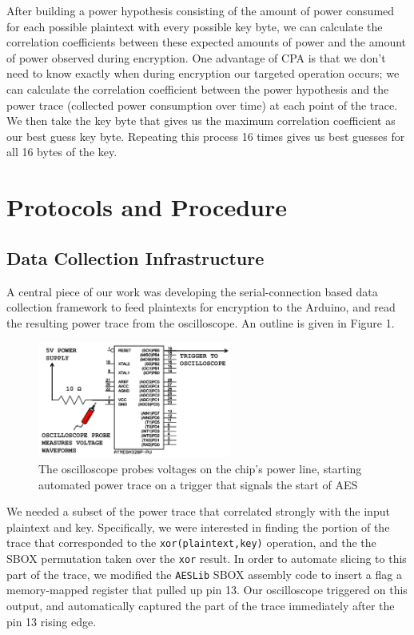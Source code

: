 \documentclass[journal]{ieee_style}
\begin{document}
After building a power hypothesis consisting of the amount of power consumed for each possible plaintext with every possible key byte, we can calculate the correlation coefficients between these expected amounts of power and the amount of power observed during encryption. One advantage of CPA is that we don't need to know exactly when during encryption our targeted operation occurs; we can calculate the correlation coefficient between the power hypothesis and the power trace (collected power consumption over time) at each point of the trace. We then take the key byte that gives us the maximum correlation coefficient as our best guess key byte. Repeating this process 16 times gives us best guesses for all 16 bytes of the key.


\section{Protocols and Procedure}
\subsection{Data Collection Infrastructure}
A central piece of our work was developing the serial-connection based data collection framework to feed plaintexts for encryption to the Arduino, and read the resulting power trace from the oscilloscope. An outline is given in Figure 1.

\begin{figure}[!t]
\centering
\includegraphics[width=2.5in]{setup}
\caption{The oscilloscope probes voltages on the chip's power line, starting automated power trace on a trigger that signals the start of AES}
\label{fig_sim}
\end{figure}

We needed a subset of the power trace that correlated strongly with the input plaintext and key. Specifically, we were interested in finding the portion of the trace that corresponded to the \texttt{xor(plaintext,key)} operation, and the the SBOX permutation taken over the \texttt{xor} result. In order to automate slicing to this part of the trace, we modified the \texttt{AESLib} SBOX assembly code to insert a flag a memory-mapped register that pulled up pin 13. Our oscilloscope triggered on this output, and automatically captured the part of the trace immediately after the pin 13 rising edge. 
\end{document}
